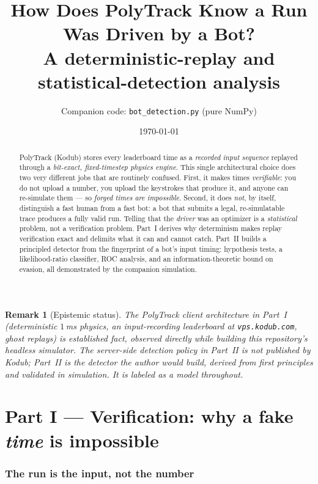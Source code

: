 \documentclass[11pt]{article}
\title{\textbf{How Does PolyTrack Know a Run Was Driven by a Bot?}\\[4pt]
\large A deterministic-replay and statistical-detection analysis}
\author{Companion code: \texttt{bot\_detection.py} (pure NumPy)}
\date{\today}
\newtheorem*{remark}{Remark}
\begin{document}
\maketitle

\begin{abstract}
PolyTrack (Kodub) stores every leaderboard time as a \emph{recorded input
sequence} replayed through a \emph{bit-exact, fixed-timestep physics engine}.
This single architectural choice does two very different jobs that are routinely
confused. First, it makes times \emph{verifiable}: you do not upload a number,
you upload the keystrokes that produce it, and anyone can re-simulate them --- so
\emph{forged times are impossible}. Second, it does \emph{not}, by itself,
distinguish a fast human from a fast bot: a bot that submits a legal,
re-simulatable trace produces a fully valid run. Telling that the \emph{driver}
was an optimizer is a \emph{statistical} problem, not a verification problem.
Part~I derives why determinism makes replay verification exact and delimits what
it can and cannot catch. Part~II builds a principled detector from the
fingerprint of a bot's input timing: hypothesis tests, a likelihood-ratio
classifier, ROC analysis, and an information-theoretic bound on evasion, all
demonstrated by the companion simulation.
\end{abstract}

\begin{remark}[Epistemic status]
The PolyTrack \emph{client} architecture in Part~I (deterministic $1$\,ms
physics, an input-recording leaderboard at \texttt{vps.kodub.com}, ghost
replays) is established fact, observed directly while building this repository's
headless simulator. The server-side \emph{detection policy} in Part~II is not
published by Kodub; Part~II is the detector the author \emph{would} build,
derived from first principles and validated in simulation. It is labeled as a
model throughout.
\end{remark}

\part*{Part I --- Verification: why a fake \emph{time} is impossible}

\section{The run is the input, not the number}
\end{document}
